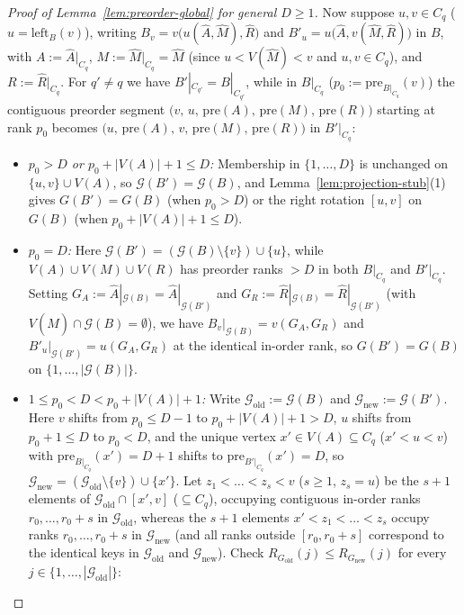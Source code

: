 \documentclass[11pt]{article}
\theoremstyle{definition}
\theoremstyle{remark}
\begin{document}
\begin{proof}[Proof of Lemma~\ref{lem:preorder-global} for general $D \ge 1$]
Now suppose $u, v \in C_q$ ($u = \mathrm{left}_B(v)$), writing $B_v = v\big(u(\widehat{A}, \widehat{M}), \widehat{R}\big)$ and $B'_u = u\big(\widehat{A}, v(\widehat{M}, \widehat{R})\big)$ in $B$, with $A := \widehat{A}|_{C_q}$, $M := \widehat{M}|_{C_q} = \widehat{M}$ (since $u < V(\widehat{M}) < v$ and $u, v \in C_q$), and $R := \widehat{R}|_{C_q}$. For $q' \ne q$ we have $B'|_{C_{q'}} = B|_{C_{q'}}$, while in $B|_{C_q}$ ($p_0 := \mathrm{pre}_{B|_{C_q}}(v)$) the contiguous preorder segment $\big(v,\, u,\, \mathrm{pre}(A),\, \mathrm{pre}(M),\, \mathrm{pre}(R)\big)$ starting at rank $p_0$ becomes $\big(u,\, \mathrm{pre}(A),\, v,\, \mathrm{pre}(M),\, \mathrm{pre}(R)\big)$ in $B'|_{C_q}$:
\begin{itemize}[leftmargin=2em]
  \item \emph{$p_0 > D$ or $p_0 + |V(A)| + 1 \le D$:} Membership in $\{1, \dots, D\}$ is unchanged on $\{u, v\} \cup V(A)$, so $\mathcal{G}(B') = \mathcal{G}(B)$, and Lemma~\ref{lem:projection-stub}(1) gives $G(B') = G(B)$ (when $p_0 > D$) or the right rotation $[u, v]$ on $G(B)$ (when $p_0 + |V(A)| + 1 \le D$).
  \item \emph{$p_0 = D$:} Here $\mathcal{G}(B') = (\mathcal{G}(B) \setminus \{v\}) \cup \{u\}$, while $V(A) \cup V(M) \cup V(R)$ has preorder ranks $> D$ in both $B|_{C_q}$ and $B'|_{C_q}$. Setting $G_A := \widehat{A}|_{\mathcal{G}(B)} = \widehat{A}|_{\mathcal{G}(B')}$ and $G_R := \widehat{R}|_{\mathcal{G}(B)} = \widehat{R}|_{\mathcal{G}(B')}$ (with $V(\widehat{M}) \cap \mathcal{G}(B) = \emptyset$), we have $B_v|_{\mathcal{G}(B)} = v(G_A, G_R)$ and $B'_u|_{\mathcal{G}(B')} = u(G_A, G_R)$ at the identical in-order rank, so $G(B') = G(B)$ on $\{1, \dots, |\mathcal{G}(B)|\}$.
  \item \emph{$1 \le p_0 < D < p_0 + |V(A)| + 1$:} Write $\mathcal{G}_{\mathrm{old}} := \mathcal{G}(B)$ and $\mathcal{G}_{\mathrm{new}} := \mathcal{G}(B')$. Here $v$ shifts from $p_0 \le D - 1$ to $p_0 + |V(A)| + 1 > D$, $u$ shifts from $p_0 + 1 \le D$ to $p_0 < D$, and the unique vertex $x' \in V(A) \subseteq C_q$ ($x' < u < v$) with $\mathrm{pre}_{B|_{C_q}}(x') = D + 1$ shifts to $\mathrm{pre}_{B'|_{C_q}}(x') = D$, so $\mathcal{G}_{\mathrm{new}} = (\mathcal{G}_{\mathrm{old}} \setminus \{v\}) \cup \{x'\}$. Let $z_1 < \dots < z_s < v$ ($s \ge 1$, $z_s = u$) be the $s + 1$ elements of $\mathcal{G}_{\mathrm{old}} \cap [x', v]$ ($\subseteq C_q$), occupying contiguous in-order ranks $r_0, \dots, r_0 + s$ in $\mathcal{G}_{\mathrm{old}}$, whereas the $s + 1$ elements $x' < z_1 < \dots < z_s$ occupy ranks $r_0, \dots, r_0 + s$ in $\mathcal{G}_{\mathrm{new}}$ (and all ranks outside $[r_0, r_0 + s]$ correspond to the identical keys in $\mathcal{G}_{\mathrm{old}}$ and $\mathcal{G}_{\mathrm{new}}$). Check $R_{G_{\mathrm{old}}}(j) \le R_{G_{\mathrm{new}}}(j)$ for every $j \in \{1, \dots, |\mathcal{G}_{\mathrm{old}}|\}$:

\end{itemize}
\end{proof}
\end{document}
